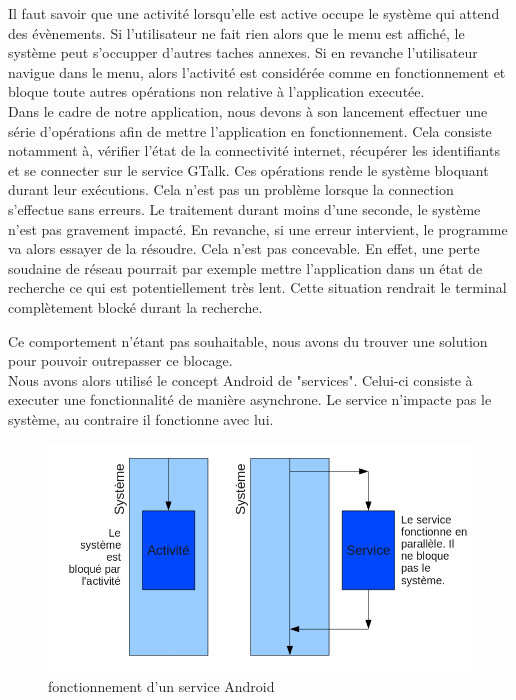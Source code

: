 Il faut savoir que une activité lorsqu'elle est active occupe le système qui attend des évènements.
Si l'utilisateur ne fait rien alors que le menu est affiché, le système peut s'occupper d'autres 
taches annexes. Si en revanche l'utilisateur navigue dans le menu, alors l'activité est considérée
comme en fonctionnement et bloque toute autres opérations non relative à l'application executée.
\\


Dans le cadre de notre application, nous devons à son lancement effectuer une série d'opérations 
afin de mettre l'application en fonctionnement. Cela consiste notamment à, vérifier l'état de la 
connectivité internet, récupérer les identifiants et se connecter sur le service GTalk. Ces 
opérations rende le système bloquant durant leur exécutions. Cela n'est pas un problème lorsque la 
connection s'effectue sans erreurs. Le traitement durant moins d'une seconde, le système n'est pas
gravement impacté. En revanche, si une erreur intervient, le programme va alors essayer de la résoudre.
Cela n'est pas concevable. En effet, une perte soudaine de réseau pourrait par exemple mettre 
l'application dans un état de recherche ce qui est potentiellement très lent. Cette situation rendrait
le terminal complètement blocké durant la recherche. 

Ce comportement n'étant pas souhaitable, nous avons du trouver une solution pour pouvoir outrepasser ce blocage.
\\


Nous avons alors utilisé le concept Android de "services". Celui-ci consiste à executer une fonctionnalité 
de manière asynchrone. Le service n'impacte pas le système, au contraire il fonctionne avec lui. 

\begin{figure}[!h]
	\center
	\includegraphics[width=13cm]{img/fonctionnement-des-services-android.png}
	\caption{fonctionnement d'un service Android}
	\label{fonctionnement-des-services-android}
\end{figure}


